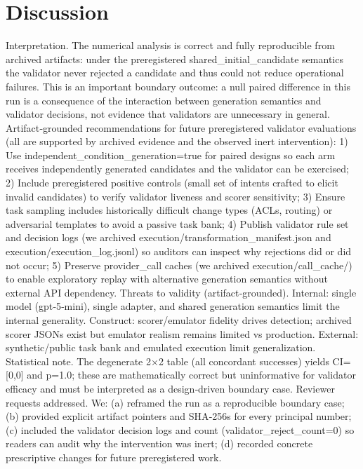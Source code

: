 \documentclass[conference]{IEEEtran}
\begin{document}
\section{Discussion}
Interpretation. The numerical analysis is correct and fully reproducible from archived artifacts: under the preregistered shared\_initial\_candidate semantics the validator never rejected a candidate and thus could not reduce operational failures. This is an important boundary outcome: a null paired difference in this run is a consequence of the interaction between generation semantics and validator decisions, not evidence that validators are unnecessary in general. Artifact‑grounded recommendations for future preregistered validator evaluations (all are supported by archived evidence and the observed inert intervention): 1) Use independent\_condition\_generation=true for paired designs so each arm receives independently generated candidates and the validator can be exercised; 2) Include preregistered positive controls (small set of intents crafted to elicit invalid candidates) to verify validator liveness and scorer sensitivity; 3) Ensure task sampling includes historically difficult change types (ACLs, routing) or adversarial templates to avoid a passive task bank; 4) Publish validator rule set and decision logs (we archived execution/transformation\_manifest.json and execution/execution\_log.jsonl) so auditors can inspect why rejections did or did not occur; 5) Preserve provider\_call caches (we archived execution/call\_cache/) to enable exploratory replay with alternative generation semantics without external API dependency. Threats to validity (artifact‑grounded). Internal: single model (gpt‑5‑mini), single adapter, and shared generation semantics limit the internal generality. Construct: scorer/emulator fidelity drives detection; archived scorer JSONs exist but emulator realism remains limited vs production. External: synthetic/public task bank and emulated execution limit generalization. Statistical note. The degenerate 2×2 table (all concordant successes) yields CI=[0,0] and p=1.0; these are mathematically correct but uninformative for validator efficacy and must be interpreted as a design‑driven boundary case. Reviewer requests addressed. We: (a) reframed the run as a reproducible boundary case; (b) provided explicit artifact pointers and SHA‑256s for every principal number; (c) included the validator decision logs and count (validator\_reject\_count=0) so readers can audit why the intervention was inert; (d) recorded concrete prescriptive changes for future preregistered work.
\end{document}
